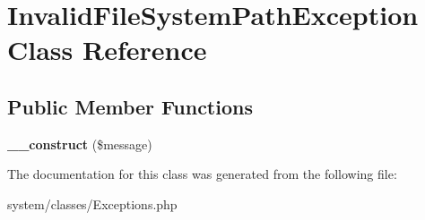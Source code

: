 \hypertarget{class_invalid_file_system_path_exception}{
\section{InvalidFileSystemPathException Class Reference}
\label{class_invalid_file_system_path_exception}
}
\subsection*{Public Member Functions}
\begin{DoxyCompactItemize}
\item 
\hypertarget{class_invalid_file_system_path_exception_a7c00c6a4981f55404b49962a66b0746a}{
{\bfseries \_\-\_\-construct} (\$message)}
\label{class_invalid_file_system_path_exception_a7c00c6a4981f55404b49962a66b0746a}

\end{DoxyCompactItemize}


The documentation for this class was generated from the following file:\begin{DoxyCompactItemize}
\item 
system/classes/Exceptions.php\end{DoxyCompactItemize}
